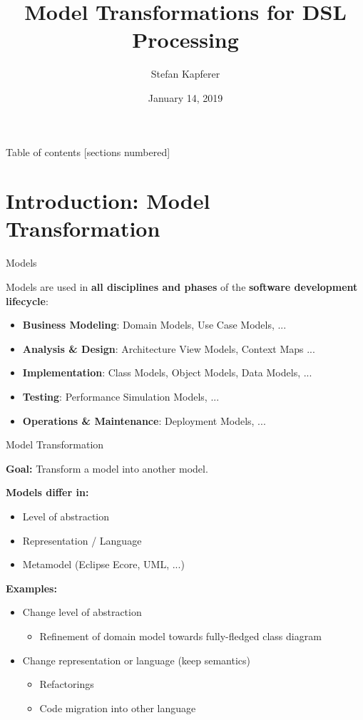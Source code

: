 \documentclass[10pt]{beamer}
\title{Model Transformations for DSL Processing}
\date{January 14, 2019}
\author{Stefan Kapferer}
\institute{University of Applied Sciences of Eastern Switzerland (HSR FHO)}
\begin{document}
\maketitle

\begin{frame}{Table of contents}
  [sections numbered]
  \tableofcontents[hideallsubsections]
\end{frame}

\section{Introduction: Model Transformation}

\begin{frame}[fragile]{Models}

	Models are used in \textbf{all disciplines and phases} of the \textbf{software development lifecycle}:
	\begin{itemize}
  		\item \textbf{Business Modeling}: Domain Models, Use Case Models, ...
  		\item \textbf{Analysis \& Design}: Architecture View Models, Context Maps ...
  		\item \textbf{Implementation}: Class Models, Object Models, Data Models, ...
  		\item \textbf{Testing}: Performance Simulation Models, ...
  		\item \textbf{Operations \& Maintenance}: Deployment Models, ...
  	\end{itemize}

\end{frame}

\begin{frame}[fragile]{Model Transformation}

	\textbf{Goal:} Transform a model into another model.	
	\bigskip
	
	\textbf{Models differ in:}
	\begin{itemize}
		\item Level of abstraction
		\item Representation / Language
		\item Metamodel (Eclipse Ecore, UML, ...)
	\end{itemize}
		
	\bigskip
	\textbf{Examples:}
	\begin{itemize}
		\item Change level of abstraction
		\begin{itemize}
			\item Refinement of domain model towards fully-fledged class diagram
		\end{itemize}
		\item Change representation or language (keep semantics)
		\begin{itemize}
			\item Refactorings
			\item Code migration into other language
		\end{itemize}
	\end{itemize}

\end{frame}
\end{document}
